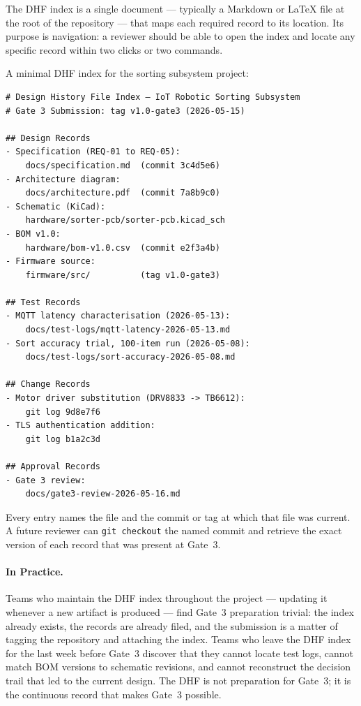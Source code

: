The DHF index is a single document --- typically a Markdown or \LaTeX{}
file at the root of the repository --- that maps each required record to its location.
Its purpose is navigation: a reviewer should be able to open the index and locate any
specific record within two clicks or two commands.

A minimal DHF index for the sorting subsystem project:

\begin{verbatim}
# Design History File Index — IoT Robotic Sorting Subsystem
# Gate 3 Submission: tag v1.0-gate3 (2026-05-15)

## Design Records
- Specification (REQ-01 to REQ-05):
    docs/specification.md  (commit 3c4d5e6)
- Architecture diagram:
    docs/architecture.pdf  (commit 7a8b9c0)
- Schematic (KiCad):
    hardware/sorter-pcb/sorter-pcb.kicad_sch
- BOM v1.0:
    hardware/bom-v1.0.csv  (commit e2f3a4b)
- Firmware source:
    firmware/src/          (tag v1.0-gate3)

## Test Records
- MQTT latency characterisation (2026-05-13):
    docs/test-logs/mqtt-latency-2026-05-13.md
- Sort accuracy trial, 100-item run (2026-05-08):
    docs/test-logs/sort-accuracy-2026-05-08.md

## Change Records
- Motor driver substitution (DRV8833 -> TB6612):
    git log 9d8e7f6
- TLS authentication addition:
    git log b1a2c3d

## Approval Records
- Gate 3 review:
    docs/gate3-review-2026-05-16.md
\end{verbatim}

Every entry names the file and the commit or tag at which that file was current.
A future reviewer can \texttt{git checkout} the named commit and retrieve the exact version
of each record that was present at Gate~3.

\paragraph{In Practice.}
Teams who maintain the DHF index throughout the project --- updating it whenever a new
artifact is produced --- find Gate~3 preparation trivial: the index already exists, the
records are already filed, and the submission is a matter of tagging the repository and
attaching the index.
Teams who leave the DHF index for the last week before Gate~3 discover that they cannot
locate test logs, cannot match BOM versions to schematic revisions, and cannot reconstruct
the decision trail that led to the current design.
The DHF is not preparation for Gate~3; it is the continuous record that makes Gate~3
possible.

